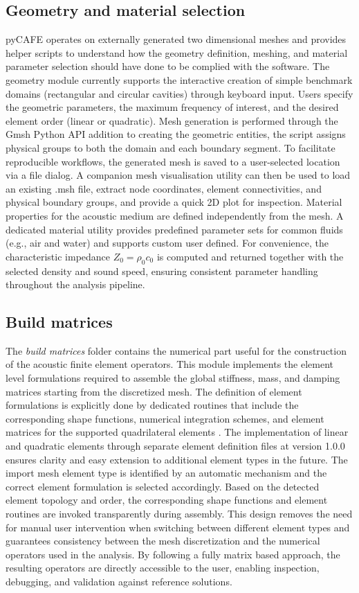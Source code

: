 \documentclass{jors}
\begin{document}
\subsection*{Geometry and material selection}
pyCAFE operates on externally generated two dimensional meshes and provides helper scripts to understand how the geometry definition, meshing, and material parameter selection should have done to be complied with the software. The geometry module currently supports the interactive creation of simple benchmark domains (rectangular and circular cavities) through keyboard input. Users specify the geometric parameters, the maximum frequency of interest, and the desired element order (linear or quadratic). Mesh generation is performed through the Gmsh Python API \cite{Gmsh2009} addition to creating the geometric entities, the script assigns physical groups to both the domain and each boundary segment.  To facilitate reproducible workflows, the generated mesh is saved to a user-selected location via a file dialog. A companion mesh visualisation utility can then be used to load an existing .msh file, extract node coordinates, element connectivities, and physical boundary groups, and provide a quick 2D plot for inspection. Material properties for the acoustic medium are defined independently from the mesh. A dedicated material utility provides predefined parameter sets for common fluids (e.g., air and water) and supports custom user defined. For convenience, the characteristic impedance $Z_0 = \rho_0 c_0$  is computed and returned together with the selected density and sound speed, ensuring consistent parameter handling throughout the analysis pipeline.

\subsection*{Build matrices}
The \textit{build matrices} folder contains the numerical part useful for the construction of the acoustic finite element operators. This module implements the element level formulations required to assemble the global stiffness, mass, and damping matrices starting from the discretized mesh. The definition of element formulations is explicitly done by dedicated routines that include the corresponding shape functions, numerical integration schemes, and element matrices for the supported quadrilateral elements \cite{Beriot2016}. The implementation of linear and quadratic elements through separate element definition files at version 1.0.0 ensures clarity and easy extension to additional element types in the future. The import mesh element type is identified by an automatic mechanism and the correct element formulation is selected accordingly. Based on the detected element topology and order, the corresponding shape functions and element routines are invoked transparently during assembly. This design removes the need for manual user intervention when switching between different element types and guarantees consistency between the mesh discretization and the numerical operators used in the analysis. By following a fully matrix based approach, the resulting operators are directly accessible to the user, enabling inspection, debugging, and validation against reference solutions. 
\end{document}
